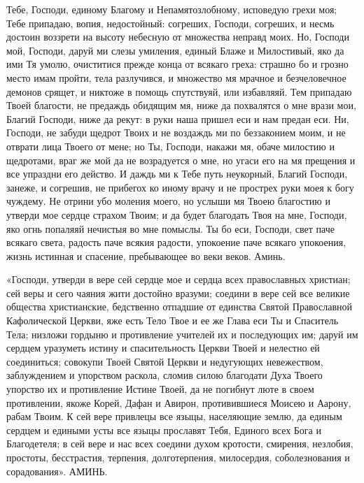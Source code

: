 Тебе, Господи, единому Благому и Непамятозлобному, исповедую грехи моя; Тебе припадаю, вопия, недостойный: согреших, Господи, согреших, и несмь достоин воззрети на высоту небесную от множества неправд моих. Но, Господи мой, Господи, даруй ми слезы умиления, единый Блаже и Милостивый, яко да ими Тя умолю, очиститися прежде конца от всякаго греха: страшно бо и грозно место имам пройти, тела разлучився, и множество мя мрачное и безчеловечное демонов срящет, и никтоже в помощь спутствуяй, или избавляяй. Тем припадаю Твоей благости, не предаждь обидящим мя, ниже да похвалятся о мне врази мои, Благий Господи, ниже да рекут: в руки наша пришел еси и нам предан еси. Ни, Господи, не забуди щедрот Твоих и не воздаждь ми по беззаконием моим, и не отврати лица Твоего от мене; но Ты, Господи, накажи мя, обаче милостию и щедротами, враг же мой да не возрадуется о мне, но угаси его на мя прещения и все упраздни его действо. И даждь ми к Тебе путь неукорный, Благий Господи, занеже, и согрешив, не прибегох ко иному врачу и не прострех руки моея к богу чуждему. Не отрини убо моления моего, но услыши мя Твоею благостию и утверди мое сердце страхом Твоим; и да будет благодать Твоя на мне, Господи, яко огнь попаляяй нечистыя во мне помыслы. Ты бо еси, Господи, свет паче всякаго света, радость паче всякия радости, упокоение паче всякаго упокоения, жизнь истинная и спасение, пребывающее во веки веков. Аминь.


\mychapterending





«Господи, утверди в вере сей сердце мое и сердца всех православных христиан; сей веры и сего чаяния жити достойно вразуми; соедини в вере сей все великие общества христианские, бедственно отпадшие от единства Святой Православной Кафолической Церкви, яже есть Тело Твое и ее же Глава еси Ты и Спаситель Тела; низложи гордыню и противление учителей их и последующих им; даруй им сердцем уразуметь истину и спасительность Церкви Твоей и нелестно ей соединиться; совокупи Твоей Святой Церкви и недугующих невежеством, заблуждением и упорством раскола, сломив силою благодати Духа Твоего упорство их и противление Истине Твоей, да не погибнут люте в своем противлении, якоже Корей, Дафан и Авирон, противившиеся Моисею и Аарону, рабам Твоим. К сей вере привлецы все языцы, населяющие землю, да единым сердцем и едиными усты все языцы прославят Тебя, Единого всех Бога и Благодетеля; в сей вере и нас всех соедини духом кротости, смирения, незлобия, простоты, бесстрастия, терпения, долготерпения, милосердия, соболезнования и сорадования». АМИНЬ.


